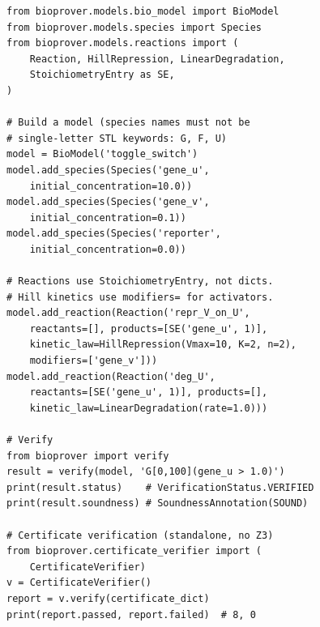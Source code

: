 \documentclass[11pt]{article}
\begin{document}
\begin{lstlisting}[caption={Core API usage (correct syntax)},label=lst:api]
from bioprover.models.bio_model import BioModel
from bioprover.models.species import Species
from bioprover.models.reactions import (
    Reaction, HillRepression, LinearDegradation,
    StoichiometryEntry as SE,
)

# Build a model (species names must not be
# single-letter STL keywords: G, F, U)
model = BioModel('toggle_switch')
model.add_species(Species('gene_u',
    initial_concentration=10.0))
model.add_species(Species('gene_v',
    initial_concentration=0.1))
model.add_species(Species('reporter',
    initial_concentration=0.0))

# Reactions use StoichiometryEntry, not dicts.
# Hill kinetics use modifiers= for activators.
model.add_reaction(Reaction('repr_V_on_U',
    reactants=[], products=[SE('gene_u', 1)],
    kinetic_law=HillRepression(Vmax=10, K=2, n=2),
    modifiers=['gene_v']))
model.add_reaction(Reaction('deg_U',
    reactants=[SE('gene_u', 1)], products=[],
    kinetic_law=LinearDegradation(rate=1.0)))

# Verify
from bioprover import verify
result = verify(model, 'G[0,100](gene_u > 1.0)')
print(result.status)    # VerificationStatus.VERIFIED
print(result.soundness) # SoundnessAnnotation(SOUND)

# Certificate verification (standalone, no Z3)
from bioprover.certificate_verifier import (
    CertificateVerifier)
v = CertificateVerifier()
report = v.verify(certificate_dict)
print(report.passed, report.failed)  # 8, 0
\end{lstlisting}
\end{document}
